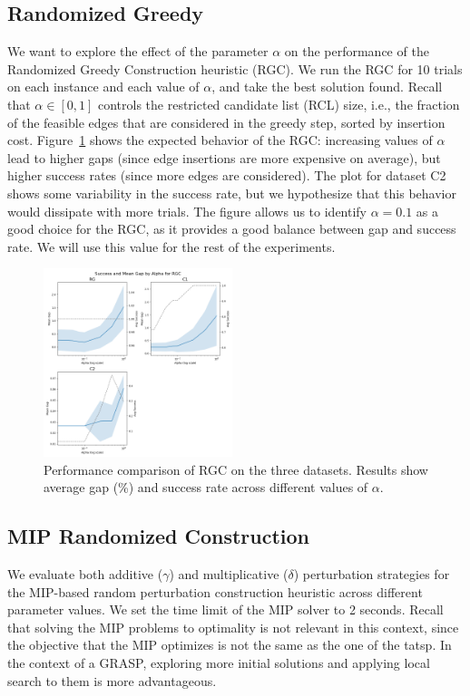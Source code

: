 \subsection{Randomized Greedy}
We want to explore the effect of the parameter $\alpha$ on the performance of the Randomized Greedy Construction heuristic (RGC).
We run the RGC for 10 trials on each instance and each value of $\alpha$, and take the best solution found.
Recall that $\alpha \in [0, 1]$ controls the restricted candidate list (RCL) size, i.e., the fraction of the feasible edges that are considered in the greedy step, sorted by insertion cost.
Figure~\ref{fig:alpha_vs_mean_gap_randomized_greedy} shows the expected behavior of the RGC:
increasing values of $\alpha$ lead to higher gaps (since edge insertions are more expensive on average), but higher success rates (since more edges are considered).
The plot for dataset C2 shows some variability in the success rate, but we hypothesize that this behavior would dissipate with more trials.
The figure allows us to identify $\alpha = 0.1$ as a good choice for the RGC, as it provides a good balance between gap and success rate.
We will use this value for the rest of the experiments.

\begin{figure}[h]
    \centering
    \includegraphics[width=0.49\textwidth]{figures/alpha_vs_mean_gap_randomized_greedy.png}
    \caption{Performance comparison of RGC on the three datasets. Results show average gap (\%) and success rate across different values of $\alpha$.}
    \label{fig:alpha_vs_mean_gap_randomized_greedy}
\end{figure}


\subsection{MIP Randomized Construction}

We evaluate both additive ($\gamma$) and multiplicative ($\delta$) perturbation strategies for the MIP-based random perturbation construction heuristic across different parameter values.
We set the time limit of the MIP solver to 2 seconds. Recall that solving the MIP problems to optimality is not relevant in this context, since the objective that the MIP optimizes is not
the same as the one of the \gls{tatsp}. In the context of a GRASP, exploring more initial solutions and applying local search to them is more advantageous.

